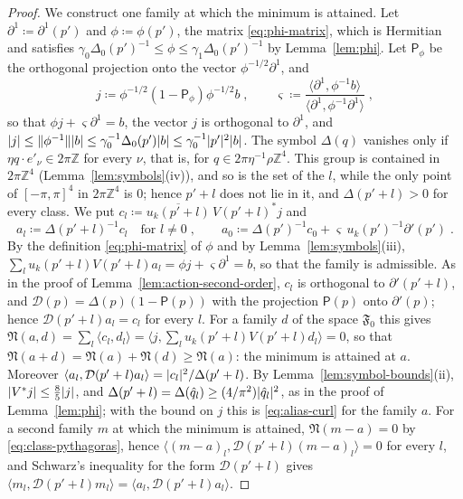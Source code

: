 \documentclass[11pt]{preprint}
\DeclarePairedDelimiter{\abs}{\lvert}{\rvert}
\DeclarePairedDelimiter{\norm}{\lVert}{\rVert}
\numberwithin{equation}{section}
\theoremstyle{definition}
\theoremstyle{remark}
\theoremstyle{plain}
\begin{document}
\begin{proof}
We construct one family at which the minimum is attained. Let $\partial^1 \coloneqq \partial^1(p')$ and $\phi \coloneqq \phi(p')$, the matrix \eqref{eq:phi-matrix}, which is Hermitian and satisfies $\gamma_0\Delta_0(p')^{-1} \leq \phi \leq \gamma_1\Delta_0(p')^{-1}$ by Lemma~\ref{lem:phi}. Let $\mathsf P_\phi$ be the orthogonal projection onto the vector $\phi^{-1/2}\partial^1$, and
\begin{equation}\label{eq:alias-multiplier}
    j \coloneqq \phi^{-1/2}(1 - \mathsf P_\phi)\phi^{-1/2}b\;,
    \qquad
    \varsigma \coloneqq \frac{\langle\partial^1, \phi^{-1}b\rangle}{\langle\partial^1, \phi^{-1}\partial^1\rangle}\;,
\end{equation}
so that $\phi j + \varsigma\partial^1 = b$, the vector $j$ is orthogonal to $\partial^1$, and $\abs j \leq \norm{\phi^{-1}}\abs b \leq \gamma_0^{-1}\Delta_0(p')\abs b \leq \gamma_0^{-1}\abs{p'}^2\abs b$. The symbol $\Delta(q)$ vanishes only if $\eta q \cdot e'_\nu \in 2\pi\mathbb Z$ for every $\nu$, that is, for $q \in 2\pi\eta^{-1}\rho\mathbb Z^4$. This group is contained in $2\pi\mathbb Z^4$ (Lemma~\ref{lem:symbols}(iv)), and so is the set of the $l$, while the only point of $[-\pi, \pi]^4$ in $2\pi\mathbb Z^4$ is $0$; hence $p' + l$ does not lie in it, and $\Delta(p' + l) > 0$ for every class. We put $c_l \coloneqq \overline{u_k(p' + l)}\,V(p' + l)^*j$ and
\begin{equation}\label{eq:alias-family}
    a_l \coloneqq \Delta(p' + l)^{-1}c_l \quad\text{for } l \neq 0\;,
    \qquad
    a_0 \coloneqq \Delta(p')^{-1}c_0 + \varsigma\,u_k(p')^{-1}\partial'(p')\;.
\end{equation}
By the definition \eqref{eq:phi-matrix} of $\phi$ and by Lemma~\ref{lem:symbols}(iii), $\sum_lu_k(p' + l)V(p' + l)a_l = \phi j + \varsigma\partial^1 = b$, so that the family is admissible. As in the proof of Lemma~\ref{lem:action-second-order}, $c_l$ is orthogonal to $\partial'(p' + l)$, and $\mathcal D(p) = \Delta(p)(1 - \mathsf P(p))$ with the projection $\mathsf P(p)$ onto $\partial'(p)$; hence $\mathcal D(p' + l)a_l = c_l$ for every $l$. For a family $d$ of the space $\mathfrak F_0$ this gives $\mathfrak N(a, d) = \sum_l\langle c_l, d_l\rangle = \langle j, \sum_lu_k(p' + l)V(p' + l)d_l\rangle = 0$, so that $\mathfrak N(a + d) = \mathfrak N(a) + \mathfrak N(d) \geq \mathfrak N(a)$: the minimum is attained at $a$. Moreover $\langle a_l, \mathcal D(p' + l)a_l\rangle = \abs{c_l}^2/\Delta(p' + l)$. By Lemma~\ref{lem:symbol-bounds}(ii), $\abs{V^*j} \leq \frac85\abs j$, and $\Delta(p' + l) = \Delta(\hat q_l) \geq (4/\pi^2)\abs{\hat q_l}^2$, as in the proof of Lemma~\ref{lem:phi}; with the bound on $j$ this is \eqref{eq:alias-curl} for the family $a$. For a second family $m$ at which the minimum is attained, $\mathfrak N(m - a) = 0$ by \eqref{eq:class-pythagoras}, hence $\langle (m - a)_l, \mathcal D(p' + l)(m - a)_l\rangle = 0$ for every $l$, and Schwarz's inequality for the form $\mathcal D(p' + l)$ gives $\langle m_l, \mathcal D(p' + l)m_l\rangle = \langle a_l, \mathcal D(p' + l)a_l\rangle$.


\end{proof}
\end{document}
